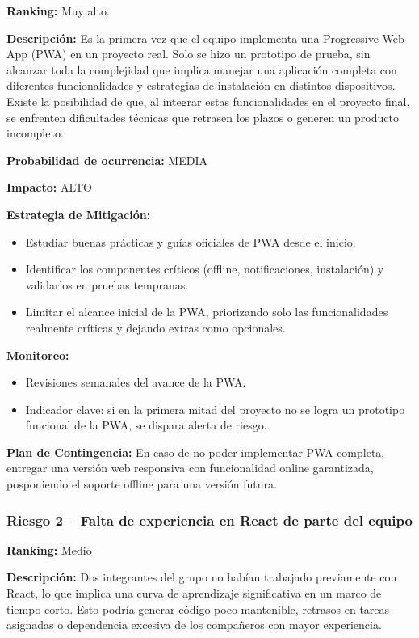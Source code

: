 \textbf{Ranking:} Muy alto.

\textbf{Descripción:} Es la primera vez que el equipo implementa una Progressive Web App (PWA) en un proyecto real. Solo se hizo un prototipo de prueba, sin alcanzar toda la complejidad que implica manejar una aplicación completa con diferentes funcionalidades y estrategias de instalación en distintos dispositivos. Existe la posibilidad de que, al integrar estas funcionalidades en el proyecto final, se enfrenten dificultades técnicas que retrasen los plazos o generen un producto incompleto.

\textbf{Probabilidad de ocurrencia:} MEDIA

\textbf{Impacto:} ALTO

\textbf{Estrategia de Mitigación:}
\begin{itemize}
    \item Estudiar buenas prácticas y guías oficiales de PWA desde el inicio.
    \item Identificar los componentes críticos (offline, notificaciones, instalación) y validarlos en pruebas tempranas.
    \item Limitar el alcance inicial de la PWA, priorizando solo las funcionalidades realmente críticas y dejando extras como opcionales.
\end{itemize}

\textbf{Monitoreo:}
\begin{itemize}
    \item Revisiones semanales del avance de la PWA.
    \item Indicador clave: si en la primera mitad del proyecto no se logra un prototipo funcional de la PWA, se dispara alerta de riesgo.
\end{itemize}

\textbf{Plan de Contingencia:} En caso de no poder implementar PWA completa, entregar una versión web responsiva con funcionalidad online garantizada, posponiendo el soporte offline para una versión futura.

\subsubsection{Riesgo 2 -- Falta de experiencia en React de parte del equipo}

\textbf{Ranking:} Medio

\textbf{Descripción:} Dos integrantes del grupo no habían trabajado previamente con React, lo que implica una curva de aprendizaje significativa en un marco de tiempo corto. Esto podría generar código poco mantenible, retrasos en tareas asignadas o dependencia excesiva de los compañeros con mayor experiencia.

